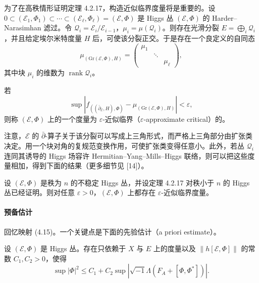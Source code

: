 为了在高秩情形证明定理 4.2.17，构造近似临界度量将是重要的。设
$0\subset(\mathcal{E}_1,\Phi_1)\subset\cdots\subset(\mathcal{E}_\ell,\Phi_\ell)=(\mathcal{E},\Phi)$
是 Higgs 丛 $(\mathcal{E},\Phi)$ 的 Harder–Narasimhan 滤过。令 $\mathcal{Q}_i=\mathcal{E}_i/\mathcal{E}_{i-1}$，$\mu_i=\mu(\mathcal{Q}_i)$。则存在光滑分裂 $E=\bigoplus_i\mathcal{Q}_i$，并且给定埃尔米特度量 $H$ 后，可使该分裂正交。于是存在一个良定义的自同态
\begin{equation}
\mu_{(\mathrm{Gr}(\mathcal{E},\Phi),H)}=
\begin{pmatrix}
\mu_1& & \\
& \ddots& \\
& &\mu_\ell
\end{pmatrix},
\label{eq:4.21}
\tag{4.21}
\end{equation}
其中块 $\mu_i$ 的维数为 $\operatorname{rank}\mathcal{Q}_i$。

\begin{definition}
若
\[
\sup\left|f_{((\bar\partial_{\mathcal{E}},H),\Phi)}-\mu_{(\mathrm{Gr}(\mathcal{E},\Phi),H)}\right|<\varepsilon,
\]
则称 $(\mathcal{E},\Phi)$ 上的一个度量为 $\varepsilon$-近似临界（$\varepsilon$-approximate critical）的。
\end{definition}

注意，$\mathcal{E}$ 的 $\bar\partial$-算子关于该分裂可以写成上三角形式，而严格上三角部分由扩张类决定。用一个块对角的复规范变换作用，可使扩张类变得任意小。此外，若丛 $\mathcal{Q}_i$ 连同其诱导的 Higgs 场容许 Hermitian–Yang–Mills–Higgs 联络，则可以把这些度量相加，得到下面的结果（更多细节见 [14]）。

\begin{lemma}
设 $(\mathcal{E},\Phi)$ 是秩为 $n$ 的不稳定 Higgs 丛，并设定理 4.2.17 对秩小于 $n$ 的 Higgs 丛已经证明。则对任意 $\varepsilon>0$，$(\mathcal{E},\Phi)$ 上都存在 $\varepsilon$-近似临界度量。
\end{lemma}

\paragraph{预备估计}
回忆映射 (4.15)。一个关键点是下面的先验估计（a priori estimate）。

\begin{proposition}
设 $(\mathcal{E},\Phi)$ 是 Higgs 丛。存在只依赖于 $X$ 与 $E$ 上的度量以及 $\|h[\mathcal{E},\Phi]\|$ 的常数 $C_1,C_2>0$，使得
\[
\sup|\Phi|^2\le C_1+C_2\sup\left|\sqrt{-1}\Lambda(F_A+[\Phi,\Phi^*])\right|.
\]
\end{proposition}

